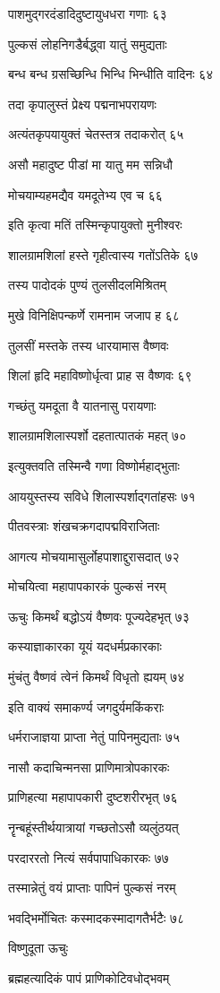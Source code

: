 पाशमुद्गरदंडादिदुष्टायुधधरा गणाः ६३

पुल्कसं लोहनिगडैर्बद्ध्वा यातुं समुद्यताः

बन्ध बन्ध ग्रसच्छिन्धि भिन्धि भिन्धीति वादिनः ६४

तदा कृपालुस्तं प्रेक्ष्य पद्मनाभपरायणः

अत्यंतकृपयायुक्तं चेतस्तत्र तदाकरोत् ६५

असौ महादुष्ट पीडां मा यातु मम सन्निधौ

मोचयाम्यहमद्यैव यमदूतेभ्य एव च ६६

इति कृत्वा मतिं तस्मिन्कृपायुक्तो मुनीश्वरः

शालग्रामशिलां हस्ते गृहीत्वास्य गतोंऽतिके ६७

तस्य पादोदकं पुण्यं तुलसीदलमिश्रितम्

मुखे विनिक्षिपन्कर्णे रामनाम जजाप ह ६८

तुलसीं मस्तके तस्य धारयामास वैष्णवः

शिलां हृदि महाविष्णोर्धृत्वा प्राह स वैष्णवः ६९

गच्छंतु यमदूता वै यातनासु परायणाः

शालग्रामशिलास्पर्शो दहतात्पातकं महत् ७०

इत्युक्तवति तस्मिन्वै गणा विष्णोर्महाद्भुताः

आययुस्तस्य सविधे शिलास्पर्शाद्गतांहसः ७१

पीतवस्त्राः शंखचक्रगदापद्मविराजिताः

आगत्य मोचयामासुर्लोहपाशाद्दुरासदात् ७२

मोचयित्वा महापापकारकं पुल्कसं नरम्

ऊचुः किमर्थं बद्धोऽयं वैष्णवः पूज्यदेहभृत् ७३

कस्याज्ञाकारका यूयं यदधर्मप्रकारकाः

मुंचंतु वैष्णवं त्वेनं किमर्थं विधृतो ह्ययम् ७४

इति वाक्यं समाकर्ण्य जगदुर्यमकिंकराः

धर्मराजाज्ञया प्राप्ता नेतुं पापिनमुद्यताः ७५

नासौ कदाचिन्मनसा प्राणिमात्रोपकारकः

प्राणिहत्या महापापकारी दुष्टशरीरभृत् ७६

नॄन्बहूंस्तीर्थयात्रायां गच्छतोऽसौ व्यलुंठयत्

परदाररतो नित्यं सर्वपापाधिकारकः ७७

तस्मान्नेतुं वयं प्राप्ताः पापिनं पुल्कसं नरम्

भवद्भिर्मोचितः कस्मादकस्मादागतैर्भटैः ७८

विष्णुदूता ऊचुः

ब्रह्महत्यादिकं पापं प्राणिकोटिवधोद्भवम्

